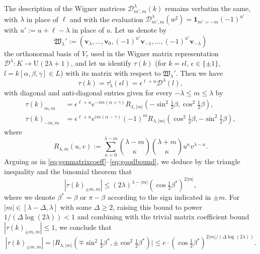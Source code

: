 \documentclass[11pt,oneside]{amsart}
\numberwithin{equation}{section}
\theoremstyle{remark}
\theoremstyle{plain}
\newcommand\UU{\mathrm{U}}
\renewcommand\leq{\leqslant}
\renewcommand\geq{\geqslant}
\begin{document}
The description of the Wigner matrices $\mathscr{D}_{m',m}^{\lambda}(k)$ remains verbatim the same, with $\lambda$ in place of $\ell$ and with the evaluation $\mathscr{D}_{m',m}^{\lambda}(w^{\sharp})=\mathbf{1}_{m'=-m}(-1)^{u'}$ with $u':=u+\ell-\lambda$ in place of $u$. Let us denote by
\[\mathfrak{W}_{\lambda}':=(\mathbf{v}_{\lambda},\dots,\mathbf{v}_0,(-1)^{u'}\mathbf{v}_{-1},\dots,(-1)^{u'}\mathbf{v}_{-\lambda})\] the orthonormal basis of $V_{\tau}$ used in the Wigner matrix representation $\mathscr{D}^{\lambda}:K\to\UU(2\lambda+1)$, and let us identify $\tau(k)$ (for $k=\epsilon l$, $\epsilon\in\{\pm 1\}$, $l=k[\alpha,\beta,\gamma]\in L$) with its matrix with respect to $\mathfrak{W}_{\lambda}'$. Then we have
\[ \tau(k)=\tau_{\lambda}^{\iota}(\epsilon l)=\epsilon^{\ell+u}\mathscr{D}^{\lambda}(l), \]
with diagonal and anti-diagonal entries given for every $-\lambda\leq m\leq\lambda$ by
\begin{align*}
\tau(k)_{m,m}&=\epsilon^{\ell+u}e^{-im(\alpha+\gamma)}R_{\lambda,|m|}(-\sin^2\tfrac12\beta,\cos^2\tfrac12\beta),\\ 
\tau(k)_{-m,m}&=\epsilon^{\ell+u}e^{im(\alpha-\gamma)}(-1)^mR_{\lambda,|m|}(\cos^2\tfrac12\beta,-\sin^2\tfrac12\beta),
\end{align*}
where
\[ R_{\lambda,m}(u,v):=\sum_{\kappa=0}^{\lambda-m}\binom{\lambda-m}{\kappa}\binom{\lambda+m}{\kappa}u^{\kappa}v^{\lambda-\kappa}. \]
Arguing as in \eqref{eq:genmatrixcoeff}--\eqref{eq:goodbound}, we deduce by the triangle inequality and the binomial theorem that
\[ |\tau(k)_{\pm m,m}|\leq (2\lambda)^{\lambda-|m|}(\cos\tfrac12\beta^{\ast})^{2|m|}, \]
where we denote $\beta^{\ast}=\beta$ or $\pi-\beta$ according to the sign indicated in $\pm m$. For $|m|\in[\lambda-\Delta,\lambda]$ with some $\Delta\geq 2$, raising this bound to power $1/(\Delta\log(2\lambda))<1$ and combining with the trivial matrix coefficient bound $|\tau(k)_{\pm m,m}|\leq 1$, we conclude that
\begin{equation}
\label{eq:goodbound-tau}
|\tau(k)_{\pm m,m}|=\big|R_{\lambda,|m|}(\mp\sin^2\tfrac12\beta^{\ast},\pm\cos^2\tfrac12\beta^{\ast})\big|
\leq e\cdot(\cos\tfrac12\beta^{\ast})^{2|m|/(\Delta\log(2\lambda))}.
\end{equation}
\end{document}
